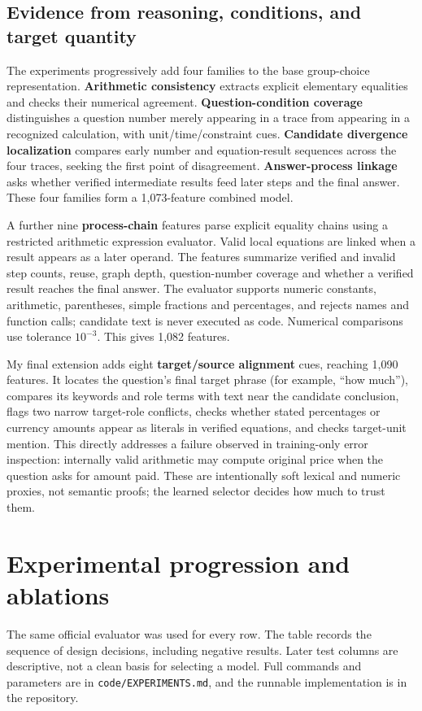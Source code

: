 \documentclass[10pt,a4paper]{article}
\newcommand{\code}[1]{\texttt{#1}}
\begin{document}
\subsection{Evidence from reasoning, conditions, and target quantity}
The experiments progressively add four families to the base group-choice representation. \textbf{Arithmetic consistency} extracts explicit elementary equalities and checks their numerical agreement. \textbf{Question-condition coverage} distinguishes a question number merely appearing in a trace from appearing in a recognized calculation, with unit/time/constraint cues. \textbf{Candidate divergence localization} compares early number and equation-result sequences across the four traces, seeking the first point of disagreement. \textbf{Answer-process linkage} asks whether verified intermediate results feed later steps and the final answer. These four families form a 1,073-feature combined model.

A further nine \textbf{process-chain} features parse explicit equality chains using a restricted arithmetic expression evaluator. Valid local equations are linked when a result appears as a later operand. The features summarize verified and invalid step counts, reuse, graph depth, question-number coverage and whether a verified result reaches the final answer. The evaluator supports numeric constants, arithmetic, parentheses, simple fractions and percentages, and rejects names and function calls; candidate text is never executed as code. Numerical comparisons use tolerance $10^{-3}$. This gives 1,082 features.

My final extension adds eight \textbf{target/source alignment} cues, reaching 1,090 features. It locates the question's final target phrase (for example, ``how much''), compares its keywords and role terms with text near the candidate conclusion, flags two narrow target-role conflicts, checks whether stated percentages or currency amounts appear as literals in verified equations, and checks target-unit mention. This directly addresses a failure observed in training-only error inspection: internally valid arithmetic may compute original price when the question asks for amount paid. These are intentionally soft lexical and numeric proxies, not semantic proofs; the learned selector decides how much to trust them.

\section{Experimental progression and ablations}
The same official evaluator was used for every row. The table records the sequence of design decisions, including negative results. Later test columns are descriptive, not a clean basis for selecting a model. Full commands and parameters are in \code{code/EXPERIMENTS.md}, and the runnable implementation is in the repository.
\end{document}
